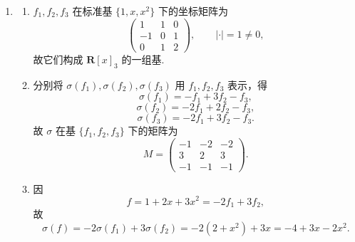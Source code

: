 \begin{enumerate}
\begin{enumerate}
        \item 对 $\alpha_1,\alpha_2,\alpha_3$ 作 Schmidt 正交化：
        \[
            v_1=\alpha_1=(1,1,1,1),\qquad \|v_1\|^2=4,
        \]
        \[
            v_2=\alpha_2-\frac{\langle\alpha_2,v_1\rangle}{\|v_1\|^2}v_1
            =\alpha_2-\alpha_1=(2,2,-2,-2),
        \]
        取 $w_2=(1,1,-1,-1)$，则 $\|w_2\|^2=4$；
        \[
            v_3=\alpha_3-\frac{\langle\alpha_3,v_1\rangle}{\|v_1\|^2}v_1
            -\frac{\langle\alpha_3,w_2\rangle}{\|w_2\|^2}w_2
            =(-1,1,-1,1),
        \]
        且 $\|v_3\|^2=4$. 故 $W$ 的一组单位正交基为
        \[
            \frac12(1,1,1,1),\quad
            \frac12(1,1,-1,-1),\quad
            \frac12(-1,1,-1,1).
        \]
    \end{enumerate}

    \item
    \begin{enumerate}
        \item $f_1,f_2,f_3$ 在标准基 $\{1,x,x^2\}$ 下的坐标矩阵为
        \[
            \begin{pmatrix}
                1&1&0\\
                -1&0&1\\
                0&1&2
            \end{pmatrix},\qquad |\cdot|=1\neq 0,
        \]
        故它们构成 $\mathbf{R}[x]_3$ 的一组基.

        \item 分别将 $\sigma(f_1),\sigma(f_2),\sigma(f_3)$ 用 $f_1,f_2,f_3$ 表示，得
        \[
            \sigma(f_1)=-f_1+3f_2-f_3,
        \]
        \[
            \sigma(f_2)=-2f_1+2f_2-f_3,
        \]
        \[
            \sigma(f_3)=-2f_1+3f_2-f_3.
        \]
        故 $\sigma$ 在基 $\{f_1,f_2,f_3\}$ 下的矩阵为
        \[
            M=\begin{pmatrix}
                -1&-2&-2\\
                3&2&3\\
                -1&-1&-1
            \end{pmatrix}.
        \]

        \item 因
        \[
            f=1+2x+3x^2=-2f_1+3f_2,
        \]
        故
        \[
            \sigma(f)=-2\sigma(f_1)+3\sigma(f_2)
            =-2(2+x^2)+3x
            =-4+3x-2x^2.
        \]
    \end{enumerate}


\end{enumerate}
